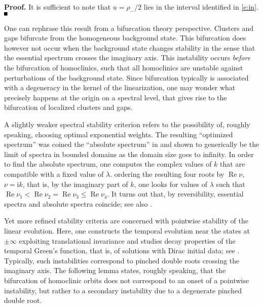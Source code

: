 \documentclass[10pt]{article}
\newenvironment{Proof}%
 {\begin{trivlist} \item[]{\bf Proof. }}%
 {\hspace*{\fill}$\rule{.4\baselineskip}{.4\baselineskip}$\end{trivlist}}
\def\Re{\mathop{\mathrm{Re}}}
\newcommand{\rmi}{\mathrm{i}}
\renewcommand{\leq}{\leqslant}
\begin{document}
\begin{Proof}
 It is sufficient to note that $u=\rho_-/2$ lies in the interval identified in \eqref{e:in}.
\end{Proof}
One can rephrase this result from a bifurcation theory perspective. Clusters and gaps bifurcate from the homogeneous background state. This bifurcation does however not occur when the background state changes stability in the sense that the essential spectrum crosses the imaginary axis. This instability occurs \emph{before} the bifurcation of homoclinics, such that all homoclinics are unstable against perturbations of the background state. Since bifurcation typically is associated with a degeneracy in the kernel of the linearization, one may wonder what precisely happens at the origin on a spectral level, that gives rise to the bifurcation of localized clusters and gaps. 

A slightly weaker spectral stability criterion refers to the possibility of, roughly speaking,  choosing optimal exponential weights. The resulting ``optimized spectrum'' was coined the ``absolute spectrum'' in \cite{ssabs} and shown to generically be the limit of spectra in bounded domains as the domain size goes to infinity. In order to find the absolute spectrum, one computes the complex values of $k$ that are compatible with a fixed value of $\lambda$. ordering the resulting four roots by $\Re\nu$,  $\nu=\rmi k$, that is, by the imaginary part of $k$, one looks for values of $\lambda$ such that $\Re\nu_1<\Re\nu_2=\Re\nu_3\leq \Re\nu_4$. It turns out that, by reversibility, essential spectra and absolute spectra coincide; see also \cite{rss}. 

Yet more refined stability criteria are concerned with pointwise stability of the linear evolution. Here, one constructs the temporal evolution near the states at $\pm\infty$ exploiting translational invariance and studies decay properties of the temporal Green's function, that is, of solutions with Dirac initial data; see \cite{holzerscheel}. Typically, such instabilities correspond to pinched double roots crossing the imaginary axis. The following lemma states, roughly speaking, that the bifurcation of homoclinic orbits does not correspond to an onset of a pointwise instability, but rather to a secondary instability due to a degenerate pinched double root.  
\end{document}
